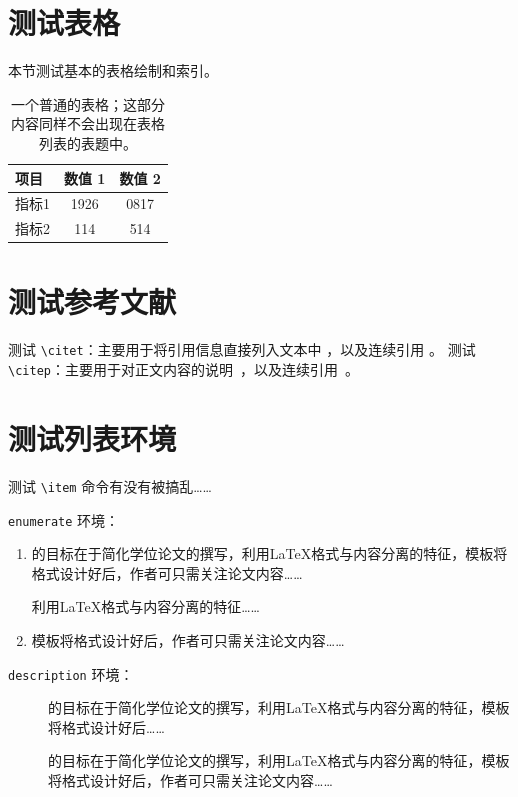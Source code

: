 \documentclass[
  fontset = mac,
]{shtthesis}
\begin{document}
\section{测试表格}
本节测试基本的表格绘制和索引。

\begin{table}[htb]
  \centering
  \caption[一个普通的表格]{一个普通的表格；这部分内容同样不会出现在表格列表的表题中。}
  \begin{tabular}{lcc}
    \hline
    项目 & 数值 1 & 数值 2 \\
    \hline
    指标1 & 1926 & 0817 \\
    指标2 & 114  & 514 \\
    \hline
  \end{tabular}
\end{table}

\section{测试参考文献}
测试 \verb|\citet|：主要用于将引用信息直接列入文本中 \citet{wikibook2014latex}，以及连续引用 \citet{lamport1986document, chen2005zhulu}。
测试 \verb|\citep|：主要用于对正文内容的说明~\citep{chu2004tushu}，以及连续引用~\citep{stamerjohanns2009mathml, betts2005aging}。

\section{测试列表环境}
测试 \verb|\item| 命令有没有被搞乱……

\verb|enumerate| 环境：
\begin{enumerate}
  \item \shtthesis 的目标在于简化学位论文的撰写，利用\LaTeX{}格式与内容分离的特征，模板将格式设计好后，作者可只需关注论文内容……

  \shtthesis 利用\LaTeX{}格式与内容分离的特征……
  \item \shtthesis 模板将格式设计好后，作者可只需关注论文内容……
\end{enumerate}

\verb|description| 环境：
\begin{description}
  \item[\shtthesis] 的目标在于简化学位论文的撰写，利用\LaTeX{}格式与内容分离的特征，模板将格式设计好后……
  \item[\shtthesis] 的目标在于简化学位论文的撰写，利用\LaTeX{}格式与内容分离的特征，模板将格式设计好后，作者可只需关注论文内容……
\end{description}
\end{document}
